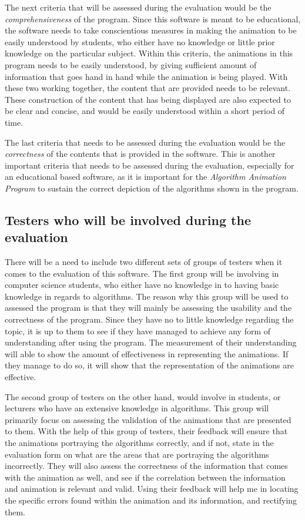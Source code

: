 The next criteria that will be assessed during the evaluation would be the \textit{comprehensiveness} of the program. Since this software is meant to be educational, the software needs to take conscientious measures in making the animation to be easily understood by students, who either have no knowledge or little prior knowledge on the particular subject. Within this criteria, the animations in this program needs to be easily understood, by giving sufficient amount of information that goes hand in hand while the animation is being played. With these two working together, the content that are provided needs to be relevant. These construction of the content that has being displayed are also expected to be clear and concise, and would be easily understood within a short period of time. 

The last criteria that needs to be assessed during the evaluation would be the \textit{correctness} of the contents that is provided in the software. This is another important criteria that needs to be assessed during the evaluation, especially for an educational based software, as it is important for the \textit{Algorithm Animation Program} to sustain the correct depiction of the algorithms shown in the program. 

\subsection{Testers who will be involved during the evaluation}
There will be a need to include two different sets of groups of testers when it comes to the evaluation of this software. The first group will be involving in computer science students, who either have no knowledge in to having basic knowledge in regards to algorithms. The reason why this group will be used to assessed the program is that they will mainly be assessing the usability and the correctness of the program. Since they have no to little knowledge regarding the topic, it is up to them to see if they have managed to achieve any form of understanding after using the program. The measurement of their understanding will able to show the amount of effectiveness in representing the animations. If they manage to do so, it will show that the representation of the animations are effective.

The second group of testers on the other hand, would involve in students, or lecturers who have an extensive knowledge in algorithms. This group will primarily focus on assessing the validation of the animations that are presented to them. With the help of this group of testers, their feedback will ensure that the animations portraying the algorithms correctly, and if not, state in the evaluation form on what are the areas that are portraying the algorithms incorrectly. They will also assess the correctness of the information that comes with the animation as well, and see if the correlation between the information and animation is relevant and valid. Using their feedback will help me in locating the specific errors found within the animation and its information, and rectifying them.


